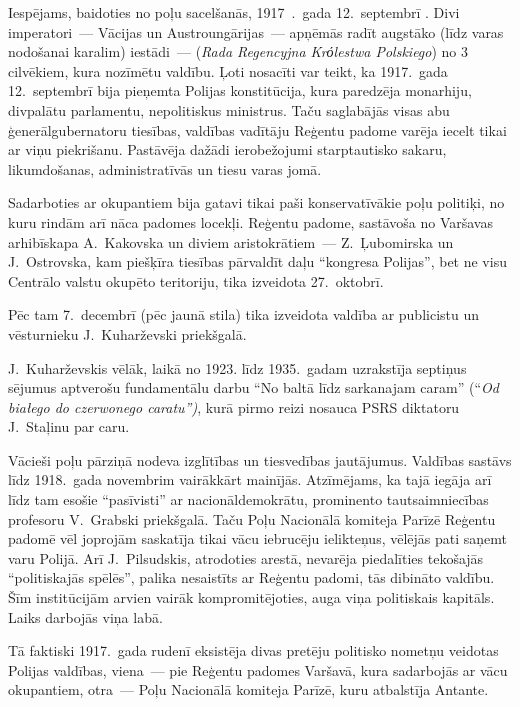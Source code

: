 \documentclass[twoside,a5paper,12pt,fleqn,openany]{extbook}
\newcommand{\pltxti}[1]{\textit{\textpolish{#1}}}
\begin{document}
Iespējams, baidoties no poļu sacelšanās, 1917~.~gada 12.~septembrī . Divi imperatori~--- Vācijas un Austroungārijas~--- apņēmās radīt augstāko (līdz varas nodošanai karalim) iestādi~---  (\pltxti{Rada Regencyjna Krόlestwa Polskiego}) no 3 cilvēkiem, kura nozīmētu valdību. Ļoti nosacīti var teikt, ka 1917.~gada 12.~septembrī bija pieņemta Polijas konstitūcija, kura paredzēja monarhiju, divpalātu parlamentu, nepolitiskus ministrus. Taču saglabājās visas abu ģenerālgubernatoru tiesības, valdības vadītāju Reģentu padome varēja iecelt tikai ar viņu piekrišanu. Pastāvēja dažādi ierobežojumi starptautisko sakaru, likumdošanas, administratīvās un tiesu varas jomā.

Sadarboties ar okupantiem bija gatavi tikai paši konservatīvākie poļu politiķi, no kuru rindām arī nāca padomes locekļi. Reģentu padome, sastāvoša no Varšavas arhibīskapa A.~Kakovska un diviem aristokrātiem~--- Z.~Ļubomirska un J.~Ostrovska, kam piešķīra tiesības pārvaldīt daļu ``kongresa Polijas'', bet ne visu Centrālo valstu okupēto teritoriju, tika izveidota 27.~oktobrī.

Pēc tam 7.~decembrī (pēc jaunā stila) tika izveidota valdība ar publicistu un vēsturnieku J.~Kuharževski priekšgalā.

J.~Kuharževskis vēlāk, laikā no 1923. līdz 1935.~gadam uzrakstīja septiņus sējumus aptverošu fundamentālu darbu ``No baltā līdz sarkanajam caram'' (``\pltxti{Od białego do czerwonego caratu'')}, kurā pirmo reizi nosauca PSRS diktatoru J.~Staļinu par caru.

Vācieši poļu pārziņā nodeva izglītības un tiesvedības jautājumus. Valdības sastāvs līdz 1918.~gada novembrim vairākkārt mainījās. Atzīmējams, ka tajā iegāja arī līdz tam esošie ``pasīvisti'' ar nacionāldemokrātu, prominento tautsaimniecības profesoru V.~Grabski priekšgalā. Taču Poļu Nacionālā komiteja Parīzē Reģentu padomē vēl joprojām saskatīja tikai vācu iebrucēju ielikteņus, vēlējās pati saņemt varu Polijā. Arī J.~Pilsudskis, atrodoties arestā, nevarēja piedalīties tekošajās ``politiskajās spēlēs'', palika nesaistīts ar Reģentu padomi, tās dibināto valdību. Šīm institūcijām arvien vairāk kompromitējoties, auga viņa politiskais kapitāls. Laiks darbojās viņa labā.

Tā faktiski 1917.~gada rudenī eksistēja divas pretēju politisko nometņu veidotas Polijas valdības, viena~--- pie Reģentu padomes Varšavā, kura sadarbojās ar vācu okupantiem, otra~--- Poļu Nacionālā komiteja Parīzē, kuru atbalstīja Antante.
\end{document}
